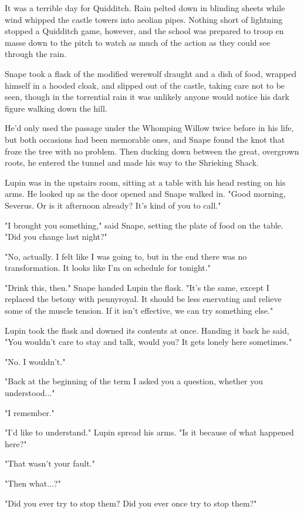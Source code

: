 It was a terrible day for Quidditch. Rain pelted down in blinding sheets while wind whipped the castle towers into aeolian pipes. Nothing short of lightning stopped a Quidditch game, however, and the school was prepared to troop en masse down to the pitch to watch as much of the action as they could see through the rain.

Snape took a flask of the modified werewolf draught and a dish of food, wrapped himself in a hooded cloak, and slipped out of the castle, taking care not to be seen, though in the torrential rain it was unlikely anyone would notice his dark figure walking down the hill.

He'd only used the passage under the Whomping Willow twice before in his life, but both occasions had been memorable ones, and Snape found the knot that froze the tree with no problem. Then ducking down between the great, overgrown roots, he entered the tunnel and made his way to the Shrieking Shack.

Lupin was in the upstairs room, sitting at a table with his head resting on his arms. He looked up as the door opened and Snape walked in. "Good morning, Severus. Or is it afternoon already? It's kind of you to call."

"I brought you something," said Snape, setting the plate of food on the table. "Did you change last night?"

"No, actually. I felt like I was going to, but in the end there was no transformation. It looks like I'm on schedule for tonight."

"Drink this, then." Snape handed Lupin the flask. "It's the same, except I replaced the betony with pennyroyal. It should be less enervating and relieve some of the muscle tension. If it isn't effective, we can try something else."

Lupin took the flask and downed its contents at once. Handing it back he said, "You wouldn't care to stay and talk, would you? It gets lonely here sometimes."

"No. I wouldn't."

"Back at the beginning of the term I asked you a question, whether you understood..."

"I remember."

"I'd like to understand." Lupin spread his arms. "Is it because of what happened here?"

"That wasn't your fault."

"Then what...?"

"Did you ever try to stop them? Did you ever once try to stop them?"

